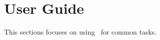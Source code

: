 \chapter{User Guide}
\label{ch:userguide}

This sections focuses on using \texnicle\ for common tasks. 




